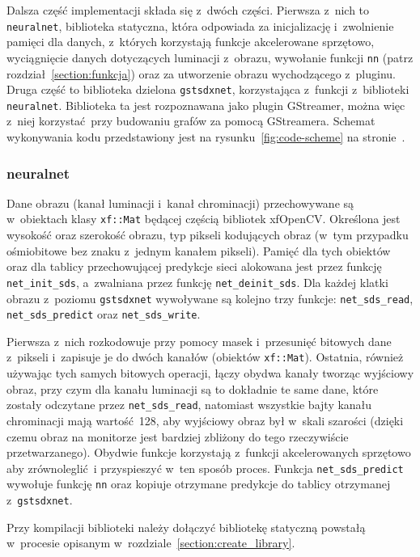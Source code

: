 \documentclass[12pt, oneside, a4paper]{article}
\begin{document}
Dalsza część implementacji składa się z~dwóch części.
Pierwsza z~nich to \lstinline{neuralnet}, biblioteka statyczna, która
odpowiada za inicjalizację i~zwolnienie pamięci dla danych, z~których
korzystają funkcje akcelerowane sprzętowo,
wyciągnięcie danych dotyczących luminacji z~obrazu,
wywołanie funkcji \lstinline{nn} (patrz rozdział~\ref{section:funkcja}) oraz
za utworzenie obrazu wychodzącego z~pluginu.
Druga część to biblioteka dzielona \lstinline{gstsdxnet}, korzystająca
z~funkcji z~biblioteki \lstinline{neuralnet}. Biblioteka ta jest rozpoznawana
jako plugin GStreamer, można więc z~niej korzystać przy budowaniu
grafów za pomocą GStreamera. Schemat wykonywania kodu przedstawiony jest
na rysunku~\ref{fig:code-scheme} na stronie~\pageref{fig:code-scheme}.

\subsubsection{neuralnet}\label{sec:neuralnet}
Dane obrazu (kanał luminacji i~kanał chrominacji)
przechowywane są w~obiektach klasy \lstinline{xf::Mat} będącej
częścią bibliotek xfOpenCV. Określona jest wysokość oraz szerokość obrazu,
typ pikseli kodujących obraz (w~tym przypadku ośmiobitowe bez znaku
z~jednym kanałem pikseli). Pamięć dla tych obiektów oraz dla tablicy
przechowującej predykcje sieci alokowana jest przez
funkcję \lstinline{net_init_sds}, a~zwalniana przez funkcję
\lstinline{net_deinit_sds}. Dla każdej klatki obrazu z~poziomu
\lstinline{gstsdxnet} wywoływane są kolejno trzy funkcje:
\lstinline{net_sds_read},
\lstinline{net_sds_predict} oraz
\lstinline{net_sds_write}.

Pierwsza z~nich rozkodowuje przy pomocy masek i~przesunięć bitowych
dane z~pikseli i~zapisuje je do dwóch kanałów (obiektów \lstinline{xf::Mat}).
Ostatnia, również używając tych samych bitowych operacji, łączy obydwa kanały
tworząc wyjściowy obraz, przy czym dla kanału luminacji są to dokładnie te
same dane, które zostały odczytane przez \lstinline{net_sds_read},
natomiast wszystkie bajty kanału chrominacji mają wartość 128,
aby wyjściowy obraz był w~skali szarości (dzięki czemu
obraz na monitorze jest bardziej zbliżony do tego rzeczywiście przetwarzanego).
Obydwie funkcje korzystają z~funkcji akcelerowanych
sprzętowo aby zrównoleglić i przyspieszyć w~ten sposób proces.
Funkcja \lstinline{net_sds_predict} wywołuje funkcję \lstinline{nn} oraz
kopiuje otrzymane predykcje do tablicy otrzymanej z~\lstinline{gstsdxnet}.

Przy kompilacji biblioteki należy dołączyć bibliotekę statyczną
powstałą w~procesie opisanym w~rozdziale~\ref{section:create_library}.
\end{document}
